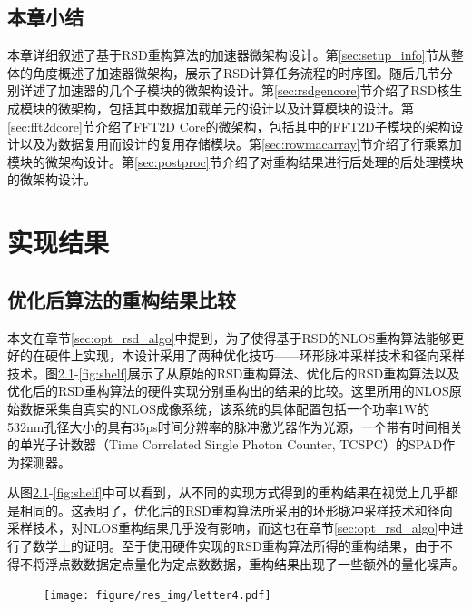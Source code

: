\documentclass[master]{shtthesis}             %
\begin{document}
\section{本章小结}

本章详细叙述了基于RSD重构算法的加速器微架构设计。第\ref{sec:setup_info}节从整体的角度概述了加速器微架构，展示了RSD计算任务流程的时序图。随后几节分别详述了加速器的几个子模块的微架构设计。第\ref{sec:rsdgencore}节介绍了RSD核生成模块的微架构，包括其中数据加载单元的设计以及计算模块的设计。第\ref{sec:fft2dcore}节介绍了FFT2D Core的微架构，包括其中的FFT2D子模块的架构设计以及为数据复用而设计的复用存储模块。第\ref{sec:rowmacarray}节介绍了行乘累加模块的微架构设计。第\ref{sec:postproc}节介绍了对重构结果进行后处理的后处理模块的微架构设计。

\chapter{实现结果}
\section{优化后算法的重构结果比较}\label{sec:recons_res_comp}

本文在章节\ref{sec:opt_rsd_algo}中提到，为了使得基于RSD的NLOS重构算法能够更好的在硬件上实现，本设计采用了两种优化技巧——环形脉冲采样技术和径向采样技术。图\ref{fig:letter4}-\ref{fig:shelf}展示了从原始的RSD重构算法、优化后的RSD重构算法以及优化后的RSD重构算法的硬件实现分别重构出的结果的比较。这里所用的NLOS原始数据采集自真实的NLOS成像系统\citep{Liu}，该系统的具体配置包括一个功率1W的532nm孔径大小的具有35ps时间分辨率的脉冲激光器作为光源，一个带有时间相关的单光子计数器（Time Correlated Single Photon Counter, TCSPC）的SPAD作为探测器。

从图\ref{fig:letter4}-\ref{fig:shelf}中可以看到，从不同的实现方式得到的重构结果在视觉上几乎都是相同的。这表明了，优化后的RSD重构算法所采用的环形脉冲采样技术和径向采样技术，对NLOS重构结果几乎没有影响，而这也在章节\ref{sec:opt_rsd_algo}中进行了数学上的证明。至于使用硬件实现的RSD重构算法所得的重构结果，由于不得不将浮点数数据定点量化为定点数数据，重构结果出现了一些额外的量化噪声。
\begin{figure}[htbp]
  \centering
  \texttt{[image: figure/res\_img/letter4.pdf]}
  \label{fig:letter4}
\end{figure}
\end{document}
